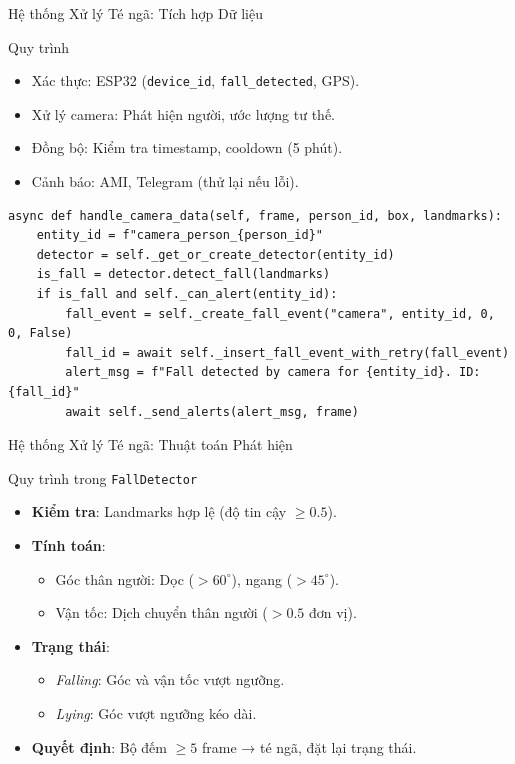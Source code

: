 \begin{frame}[fragile]{Hệ thống Xử lý Té ngã: Tích hợp Dữ liệu}
    \begin{block}{Quy trình}
        \begin{itemize}
            \item Xác thực: ESP32 (\texttt{device\_id}, \texttt{fall\_detected}, GPS).
            \item Xử lý camera: Phát hiện người, ước lượng tư thế.
            \item Đồng bộ: Kiểm tra timestamp, cooldown (5 phút).
            \item Cảnh báo: AMI, Telegram (thử lại nếu lỗi).
        \end{itemize}
    \end{block}
    \begin{verbatim}
async def handle_camera_data(self, frame, person_id, box, landmarks):
    entity_id = f"camera_person_{person_id}"
    detector = self._get_or_create_detector(entity_id)
    is_fall = detector.detect_fall(landmarks)
    if is_fall and self._can_alert(entity_id):
        fall_event = self._create_fall_event("camera", entity_id, 0, 0, False)
        fall_id = await self._insert_fall_event_with_retry(fall_event)
        alert_msg = f"Fall detected by camera for {entity_id}. ID: {fall_id}"
        await self._send_alerts(alert_msg, frame)
    \end{verbatim}
    \label{subsubsec:multi_input_fusion}
\end{frame}

\begin{frame}{Hệ thống Xử lý Té ngã: Thuật toán Phát hiện}
    \begin{block}{Quy trình trong \texttt{FallDetector}}
        \begin{itemize}
            \item \textbf{Kiểm tra}: Landmarks hợp lệ (độ tin cậy $\geq 0.5$).
            \item \textbf{Tính toán}: 
                \begin{itemize}
                    \item Góc thân người: Dọc ($>60^\circ$), ngang ($>45^\circ$).
                    \item Vận tốc: Dịch chuyển thân người ($>0.5$ đơn vị).
                \end{itemize}
            \item \textbf{Trạng thái}:
                \begin{itemize}
                    \item \textit{Falling}: Góc và vận tốc vượt ngưỡng.
                    \item \textit{Lying}: Góc vượt ngưỡng kéo dài.
                \end{itemize}
            \item \textbf{Quyết định}: Bộ đếm $\geq 5$ frame → té ngã, đặt lại trạng thái.
        \end{itemize}
    \end{block}
    \label{subsubsec:fall_detection_algorithm}
\end{frame}

